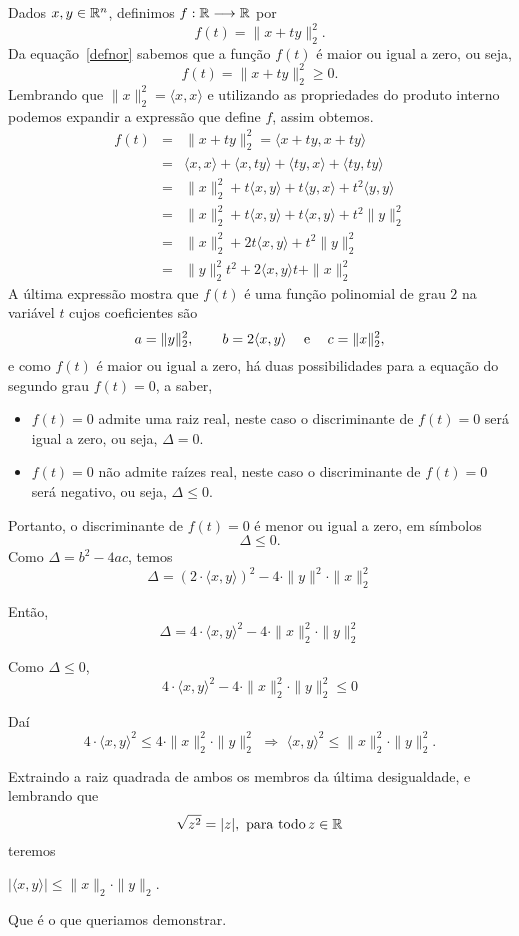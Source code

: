 \documentclass[glenn,refnum,codigo]{Estilo}
\begin{document}
\begin{prova}
	
	Dados $x, y \in \mathbb{R}^n$, definimos $f: \mathbb{R} \longrightarrow \mathbb{R}$ por
	\[
	f(t)=\| x + ty \|_2^2.
	\]
	Da equação~\ref{defnor} sabemos que a função $f(t)$ é maior ou igual a
	zero, ou seja,
	\[
	f(t) = \|x + ty\|_2^2 \geqslant 0.
	\]
	Lembrando que $\|x\|_2^2 = \langle x,x \rangle$ e utilizando as propriedades do
	produto
	interno podemos expandir a expressão que define $f$, assim obtemos.
	\begin{eqnarray*}
		f(t) &=& \|x + ty\|_2^2 = \langle x + ty, x + ty \rangle  \\
		     &=& \langle x,x \rangle + \langle x,ty \rangle + 
		         \langle ty,x  \rangle + \langle ty, ty \rangle  \\
		     &=& \|x\|_2^2 + t \langle x,y \rangle + t\langle y,x \rangle + 
		         t^2 \langle y,y \rangle  \\
		     &=& \|x\|_2^2 + t \langle x,y \rangle + t \langle x,y \rangle +
		         t^2\|y\|_2^2  \\
	     	 &=& \|x\|_2^2 + 2t \langle x,y \rangle + t^2\|y\|_2^2  \\
		     &=& \|y\|_2^2t^2 + 2 \langle x,y \rangle t + \|x\|_2^2
	\end{eqnarray*}
	A última expressão mostra que $f(t)$ é uma função polinomial de grau $2$ na
	variável $t$ cujos coeficientes são
	\[
	a=\|y\|_2^2, \qquad b=2 \langle x,y \rangle \hspace{1.25em}\hbox{e}\hspace{1.25em} c=\|x\|_2^2,
	\]
	e como $f(t)$ é maior ou igual a zero, há duas possibilidades para a equação do
	segundo grau $f(t)=0$, a saber,
	\begin{itemize}
		\item $f(t)=0$ admite uma raiz real, neste caso o discriminante de
		$f(t)=0$ será igual a zero, ou seja, $\Delta=0$.
		\item $f(t)=0$ não admite raízes real, neste caso o discriminante de
		$f(t)=0$ será negativo, ou seja, $\Delta\leqslant 0$.
	\end{itemize}
	Portanto, o discriminante de $f(t)=0$ é menor ou igual a zero, em símbolos
	\[
	\Delta \leqslant 0.
	\]
	Como $\Delta =b^2-4ac$, temos
	\[
	\Delta = (2\cdot \langle x,y \rangle)^2 - 4\cdot\|y\|^2\cdot\|x\|_2^2
	\]
	
	Então,
	\[
	\Delta = 4\cdot \langle x,y \rangle ^2 - 4\cdot\|x\|_2^2\cdot\|y\|_2^2
	\]
	
	Como $\Delta \leqslant 0$,
	\[
	4\cdot \langle x,y \rangle^2 - 4\cdot\|x\|_2^2\cdot\|y\|_2^2 \leqslant 0
	\]
	
	Daí
	\[
	4\cdot \langle x,y \rangle^2 \leqslant 4\cdot\|x\|_2^2\cdot\|y\|_2^2\,\,
	\Longrightarrow
	\,\, \langle x,y \rangle^2 \leqslant \|x\|_2^2\cdot\|y\|_2^2.
	\]
	
	Extraindo a raiz quadrada de ambos os membros da última desigualdade, e
	lembrando que
	\[
	\sqrt{z^2}=|z|, \,\,\hbox{para todo} \,z\in\mathbb{R}
	\]
	teremos
	\begin{center}
		$|\langle x,y \rangle| \leqslant \|x\|_2\cdot\|y\|_2$.
	\end{center}
	
	Que é o que queriamos demonstrar.
\end{prova}
\end{document}
